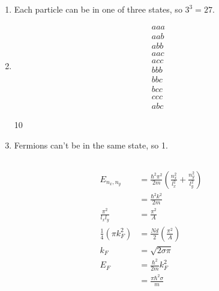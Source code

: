 \documentclass{article}
\begin{document}
\begin{enumerate}
  \item Each particle can be in one of three states, so $3^3 = 27$.

  \item

        \begin{align*}
          a a a \\
          a a b \\
          a b b \\
          a a c \\
          a c c \\
          b b b \\
          b b c \\
          b c c \\
          c c c \\
          a b c
        \end{align*}

        10

  \item Fermions can't be in the same state, so 1.
\end{enumerate}

\subsection{}

\begin{align*}
  E_{n_x, n_y}            & = \frac{\hbar^2 \pi^2}{2 m} \left( \frac{n_x^2}{l_x^2} + \frac{n_y^2}{l_y^2} \right) \\
                          & = \frac{\hbar^2 k^2}{2 m}                                                            \\
  \frac{\pi^2}{l_x l_y}   & = \frac{\pi^2}{A}                                                                    \\
  \frac{1}{4} (\pi k_F^2) & = \frac{N d}{2} \left( \frac{\pi^2}{A} \right)                                       \\
  k_F                     & = \sqrt{2 \sigma \pi}                                                                \\
  E_F                     & = \frac{\hbar^2}{2 m} k_F^2                                                          \\
                          & = \frac{\pi \hbar^2 \sigma}{m}
\end{align*}
\end{document}
